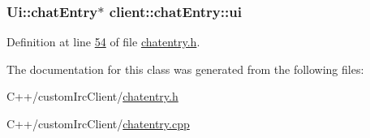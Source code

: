 \hypertarget{classclient_1_1chat_entry_a46e4de005b1411b97653601b34810ff8}{
\subsubsection[{ui}]{\setlength{\rightskip}{0pt plus 5cm}Ui\-::chat\-Entry$\ast$ client\-::chat\-Entry\-::ui\hspace{0.3cm}{\ttfamily [private]}}}\label{d5/dfb/classclient_1_1chat_entry_a46e4de005b1411b97653601b34810ff8}


Definition at line \hyperlink{chatentry_8h_source_l00054}{54} of file \hyperlink{chatentry_8h_source}{chatentry.\-h}.



The documentation for this class was generated from the following files\-:\begin{DoxyCompactItemize}
\item 
C++/custom\-Irc\-Client/\hyperlink{chatentry_8h}{chatentry.\-h}\item 
C++/custom\-Irc\-Client/\hyperlink{chatentry_8cpp}{chatentry.\-cpp}\end{DoxyCompactItemize}
